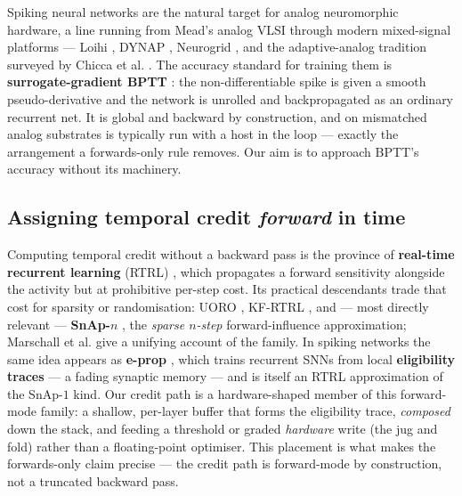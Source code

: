 \documentclass[11pt]{article}
\begin{document}
Spiking neural networks are the natural target for analog neuromorphic
hardware, a line running from Mead's analog VLSI \cite{mead1989analog}
through modern mixed-signal platforms --- Loihi \cite{davies2018loihi},
DYNAP \cite{moradi2018dynap}, Neurogrid \cite{benjamin2014neurogrid},
and the adaptive-analog tradition surveyed by Chicca et al.
\cite{chicca2014neuromorphic, rubino2023neuromorphic}. The accuracy
standard for training them is \textbf{surrogate-gradient BPTT}
\cite{neftci2019surrogate, cramer2022surrogate}: the non-differentiable
spike is given a smooth pseudo-derivative and the network is unrolled
and backpropagated as an ordinary recurrent net. It is global and
backward by construction, and on mismatched analog substrates is
typically run with a host in the loop --- exactly the arrangement a
forwards-only rule removes. Our aim is to approach BPTT's accuracy
without its machinery.

\hypertarget{assigning-temporal-credit-forward-in-time}{%
\subsection{\texorpdfstring{Assigning temporal credit \emph{forward} in
time}{Assigning temporal credit forward in time}}\label{assigning-temporal-credit-forward-in-time}}

Computing temporal credit without a backward pass is the province of
\textbf{real-time recurrent learning} (RTRL)
\cite{williams1989learning}, which propagates a forward sensitivity
alongside the activity but at prohibitive per-step cost. Its practical
descendants trade that cost for sparsity or randomisation: UORO
\cite{tallec2018unbiased}, KF-RTRL \cite{mujika2018approximating}, and
--- most directly relevant --- \textbf{SnAp-\(n\)}
\cite{menick2021snap}, the \emph{sparse \(n\)-step} forward-influence
approximation; Marschall et al. \cite{marschall2020unified} give a
unifying account of the family. In spiking networks the same idea
appears as \textbf{e-prop} \cite{bellec2020eprop}, which trains
recurrent SNNs from local \textbf{eligibility traces} --- a fading
synaptic memory --- and is itself an RTRL approximation of the
SnAp-\(1\) kind. Our credit path is a hardware-shaped member of this
forward-mode family: a shallow, per-layer buffer that forms the
eligibility trace, \emph{composed} down the stack, and feeding a
threshold or graded \emph{hardware} write (the jug and fold) rather than
a floating-point optimiser. This placement is what makes the
forwards-only claim precise --- the credit path is forward-mode by
construction, not a truncated backward pass.
\end{document}
